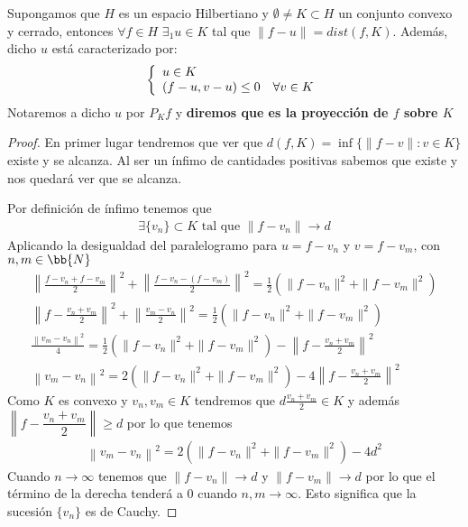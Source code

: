 \begin{teo}
    Supongamos que $H$ es un espacio Hilbertiano y $\emptyset \neq K \subset H$ un conjunto convexo y cerrado, entonces $\forall f\in H$ $\exists_1 u\in K$ tal que $\|f-u\|=dist(f,K)$. Además, dicho $u$ está caracterizado por:
    \begin{gather*}
        \left\{
            \begin{array}{l}
                u\in K\\
                (f-u, v-u)\leq 0$ \ \ $\forall v \in K
            \end{array}
        \right.
    \end{gather*}
    Notaremos a dicho $u$ por $P_Kf$ y \textbf{diremos que es la proyección de $f$ sobre $K$}

    \begin{proof}
        En primer lugar tendremos que ver que $d(f,K)=\inf\{\|f-v\|: v\in K\}$ existe y se alcanza. Al ser un ínfimo de cantidades positivas sabemos que existe y nos quedará ver que se alcanza.

        Por definición de ínfimo tenemos que 
        \begin{gather*}
            \exists\{v_n\}\subset K \text{ tal que } \|f-v_n\|\to d
        \end{gather*}
        Aplicando la desigualdad del paralelogramo para $u=f-v_n$ y $v=f-v_m$, con $n,m\in \bb{N}$
        \begin{gather*}
            \left\| \frac{f-v_n + f-v_m}{2} \right\|^2 + \left\| \frac{f-v_n-(f-v_m)}{2} \right\|^2 = \frac{1}{2}\left(\|f-v_n\|^2 + \|f-v_m\|^2\right)\\
            \left\| f - \frac{v_n+v_m}{2} \right\|^2 + \left\| \frac{v_m - v_n}{2} \right\|^2 = \frac{1}{2}\left(\|f-v_n\|^2 + \|f-v_m\|^2\right)\\
            \frac{\left\| v_m-v_n \right\|^2}{4} = \frac{1}{2}\left(\|f-v_n\|^2 + \|f-v_m\|^2\right) - \left\| f - \frac{v_n+v_m}{2} \right\|^2\\
            \left\| v_m-v_n \right\|^2 = 2\left(\|f-v_n\|^2 + \|f-v_m\|^2\right) - 4\left\| f - \frac{v_n+v_m}{2} \right\|^2
        \end{gather*}
        Como $K$ es convexo y $v_n,v_m\in K$ tendremos que $d\frac{v_n+v_m}{2}\in K$ y además $\left\|f - \dfrac{v_n+v_m}{2}\right\|\geq d$ por lo que tenemos 
        \begin{gather*}
            \left\| v_m-v_n \right\|^2 = 2\left(\|f-v_n\|^2 + \|f-v_m\|^2\right) - 4d^2
        \end{gather*}
        Cuando $n\to \infty$ tenemos que $\|f-v_n\|\to d$ y $\|f-v_m\|\to d$ por lo que el término de la derecha tenderá a 0 cuando $n,m\to\infty$. Esto significa que la sucesión $\{v_n\}$ es de Cauchy.


\end{proof}
\end{teo}
